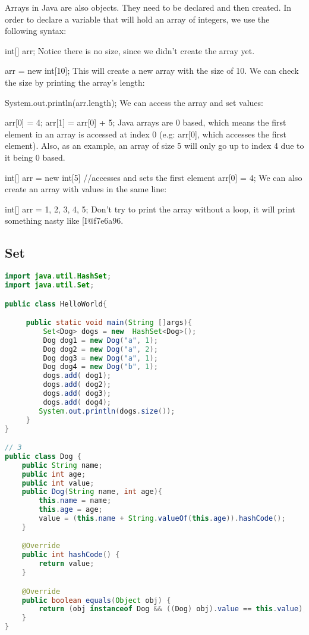 Arrays in Java are also objects. They need to be declared and then created. In order to declare a variable that will hold an array of integers, we use the following syntax:

int[] arr;
Notice there is no size, since we didn't create the array yet.

arr = new int[10];
This will create a new array with the size of 10. We can check the size by printing the array's length:

System.out.println(arr.length);
We can access the array and set values:

arr[0] = 4;
arr[1] = arr[0] + 5;
Java arrays are 0 based, which means the first element in an array is accessed at index 0 (e.g: arr[0], which accesses the first element). Also, as an example, an array of size 5 will only go up to index 4 due to it being 0 based.

int[] arr = new int[5]
//accesses and sets the first element
arr[0] = 4;
We can also create an array with values in the same line:

int[] arr = {1, 2, 3, 4, 5};
Don't try to print the array without a loop, it will print something nasty like [I@f7e6a96.

\subsection{Set}

\begin{lstlisting}[language=Java]
import java.util.HashSet;
import java.util.Set;

public class HelloWorld{

     public static void main(String []args){
         Set<Dog> dogs = new  HashSet<Dog>();
         Dog dog1 = new Dog("a", 1);
         Dog dog2 = new Dog("a", 2);
         Dog dog3 = new Dog("a", 1);
         Dog dog4 = new Dog("b", 1);
         dogs.add( dog1);
         dogs.add( dog2);
         dogs.add( dog3);
         dogs.add( dog4);
        System.out.println(dogs.size());
     }
}

// 3
public class Dog {
    public String name;
    public int age;
    public int value;
    public Dog(String name, int age){
        this.name = name;
        this.age = age;
        value = (this.name + String.valueOf(this.age)).hashCode();
    }

    @Override
    public int hashCode() {
        return value;
    }

    @Override
    public boolean equals(Object obj) {
        return (obj instanceof Dog && ((Dog) obj).value == this.value);
    }
}
\end{lstlisting}


